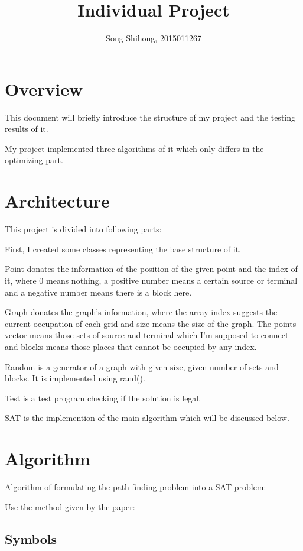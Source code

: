 \documentclass[12pt, a4paper]{article}
\title{Individual Project}
\author{Song Shihong, 2015011267}
\begin{document}
	\maketitle
	
	\tableofcontents
	\newpage
	
	\section{Overview}

	This document will briefly introduce the structure of my project and the testing results of it.

	My project implemented three algorithms of it which only differs in the optimizing part.

	\section{Architecture}

	This project is divided into following parts:

	First, I created some classes representing the base structure of it. 

	Point donates the information of the position of the given point and the index of it, where 0 means nothing, a positive number means a certain source or terminal and a negative number means there is a block here.

	Graph donates the graph's information, where the array index suggests the current occupation of each grid and size means the size of the graph. The points vector means those sets of source and terminal which I'm supposed to connect and blocks means those places that cannot be occupied by any index.

	Random is a generator of a graph with given size, given number of sets and blocks. It is implemented using rand().

	Test is a test program checking if the solution is legal.

	SAT is the implemention of the main algorithm which will be discussed below.

	\section{Algorithm}

	Algorithm of formulating the path finding problem into a SAT problem: 

		Use the method given by the paper:

			\subsection{Symbols}
\end{document}
